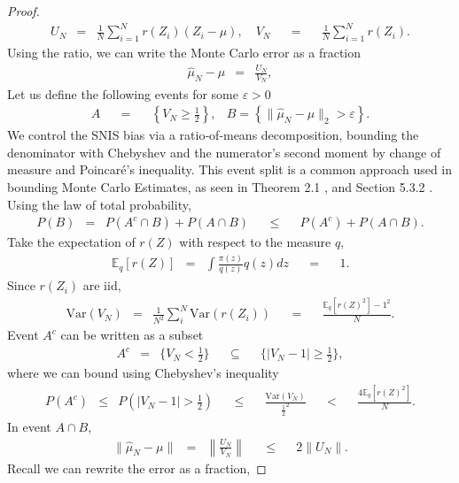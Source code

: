 \documentclass{article}
\newcommand{\E}{\mathbb{E}}
\newcommand{\amp}{\mathop{\:\:\,}\nolimits}
\theoremstyle{plain}
\theoremstyle{definition}
\theoremstyle{remark}
\begin{document}
\begin{proof}
\begin{eqnarray}
     U_N &=& \frac{1}{N}\sum_{i=1}^Nr(Z_i)(Z_i-\mu), \quad V_N \amp = \amp \frac{1}{N}\sum_{i=1}^Nr(Z_i).
\end{eqnarray}
Using the ratio, we can write the Monte Carlo error as a fraction 
\begin{eqnarray}
    \widehat{\mu}_N - \mu &=& \frac{U_N}{V_N},
\end{eqnarray}
Let us define the following events for some $\varepsilon >0$
\begin{eqnarray}
    A\amp= \amp\left\{V_N \geq \frac{1}{2}\right\},& B = \left\{\|\hat{\mu}_N- \mu\|_2 >\varepsilon\right\}.
\end{eqnarray}
We control the SNIS bias via a ratio‑of‑means decomposition, bounding the denominator with Chebyshev and the numerator’s second moment by change of measure and Poincaré's inequality. This event split is a common approach used in bounding Monte Carlo Estimates, as seen in Theorem 2.1 \cite{AgapiouPPS2017}, and Section 5.3.2 \cite{PeñaLaiShao2009}. Using the law of total probability, 
\begin{eqnarray}
    P(B) &=& P(A^c \cap B) + P(A \cap B) \amp \leq \amp P(A^c) + P(A \cap B).
\end{eqnarray}
Take the expectation of $r(Z)$ with respect to the measure $q$,
\begin{eqnarray}
    \E_q[r(Z)] &=& \int\frac{\pi(z)}{q(z)}q(z)dz\amp=\amp1.
\end{eqnarray}
Since $r(Z_i)$ are iid, 
\begin{eqnarray}
    \text{Var}(V_N) &=& \frac{1}{N^2} \sum _i^N \text{Var}\left( r(Z_i)\right) \amp  = \amp  \frac{\E_q[r(Z)^2]-1^2}{N}.
\end{eqnarray}
Event $A^c$ can be written as a subset
\begin{eqnarray}
    A^c &=& \{V_N< \frac{1}{2} \}\amp \subseteq \amp  \{|V_N - 1|  \geq \frac{1}{2}\},
\end{eqnarray}
where we can bound using Chebyshev's inequality
\begin{eqnarray}
    P(A^c) &\leq& P(|V_N - 1| > \frac{1}{2}) \amp \leq \amp\frac{\text{Var}(V_N)}{\frac{1}{2}^2} \amp < \amp \frac{4\E_q[r(Z)^2]}{N}. \label{eq: Bound on A^c}
\end{eqnarray}
In event $A \cap B$, 
\begin{eqnarray}
    \|\widehat\mu_N - \mu\| &=& \left\|\frac{U_N}{V_N}\right\| \amp \leq \amp 2\|U_N\|. 
\end{eqnarray}
Recall we can rewrite the error as a fraction, 

\end{proof}
\end{document}
